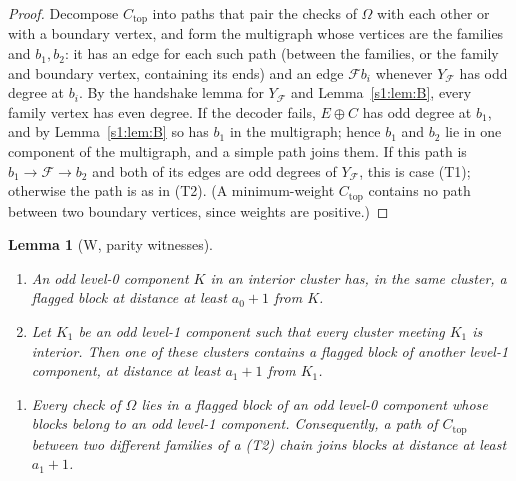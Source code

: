 \documentclass[11pt]{amsart}
\newtheorem{lemma}[theorem]{Lemma}
\theoremstyle{definition}
\theoremstyle{remark}
\numberwithin{equation}{section}
\newcommand{\cF}{\mathcal{F}}
\newcommand{\Ctop}{C_{\mathrm{top}}}
\begin{document}
\begin{proof}
Decompose $\Ctop$ into paths that pair the checks of $\Omega$ with each other or with a boundary vertex, and form the multigraph whose vertices are the families and $b_1,b_2$: it has an edge for each such path (between the families, or the family and boundary vertex, containing its ends) and an edge $\cF b_i$ whenever $Y_\cF$ has odd degree at $b_i$. By the handshake lemma for $Y_\cF$ and Lemma~\ref{s1:lem:B}, every family vertex has even degree. If the decoder fails, $E\oplus C$ has odd degree at $b_1$, and by Lemma~\ref{s1:lem:B} so has $b_1$ in the multigraph; hence $b_1$ and $b_2$ lie in one component of the multigraph, and a simple path joins them. If this path is $b_1\to\cF\to b_2$ and both of its edges are odd degrees of $Y_\cF$, this is case (T1); otherwise the path is as in (T2). (A minimum-weight $\Ctop$ contains no path between two boundary vertices, since weights are positive.)
\end{proof}

\begin{lemma}[W, parity witnesses]\label{s1:lem:W}
\leavevmode
\begin{enumerate}[label=(W\arabic*),leftmargin=2.8em,start=0]
\item An odd level-0 component $K$ in an interior cluster has, in the same cluster, a flagged block at distance at least $a_0+1$ from $K$.
\item Let $K_1$ be an odd level-1 component such that every cluster meeting $K_1$ is interior. Then one of these clusters contains a flagged block of another level-1 component, at distance at least $a_1+1$ from $K_1$.
\end{enumerate}
\begin{enumerate}[label=(R),leftmargin=2.8em]
\item Every check of $\Omega$ lies in a flagged block of an odd level-0 component whose blocks belong to an odd level-1 component. Consequently, a path of $\Ctop$ between two different families of a (T2) chain joins blocks at distance at least $a_1+1$.
\end{enumerate}
\end{lemma}
\end{document}
